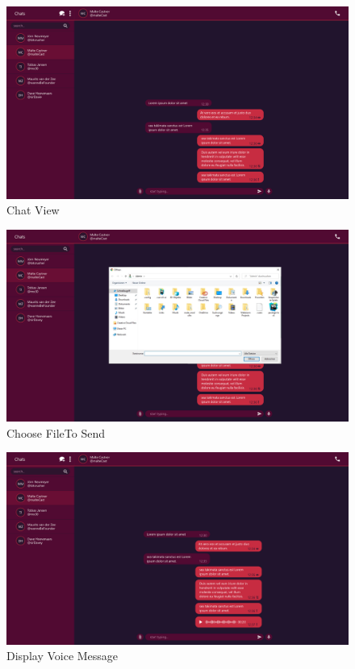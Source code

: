 \begin{figure}[h]
    \centering
    \includegraphics[width=1.0\textwidth]{./graphics/wireframes/ChatView}
    \caption{Chat View}
    \label{fig:figure14}
\end{figure}

\begin{figure}[h]
    \centering
    \includegraphics[width=1.0\textwidth]{./graphics/wireframes/ChooseFiletoSend}
    \caption{Choose FileTo Send}
    \label{fig:figure15}
\end{figure}

\begin{figure}[h]
    \centering
    \includegraphics[width=1.0\textwidth]{./graphics/wireframes/DisplayVoiceMessage}
    \caption{Display Voice Message}
    \label{fig:figure16}
\end{figure}

